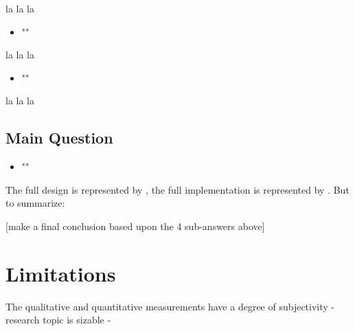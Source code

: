 la la la

\begin{itemize}[ ]
  \item "\mySubRQThree"
\end{itemize}

la la la

\begin{itemize}[ ]
  \item "\mySubRQFour"
\end{itemize}

la la la



\subsection*{Main Question}

\begin{itemize}[ ]
    \item "\myMainRQ"
\end{itemize}

The full design is represented by , the full implementation is represented by . 
But to summarize:

[make a final conclusion based upon the 4 sub-answers above]



\section*{Limitations}

The qualitative and quantitative measurements have a degree of subjectivity
- research topic is sizable
- 





